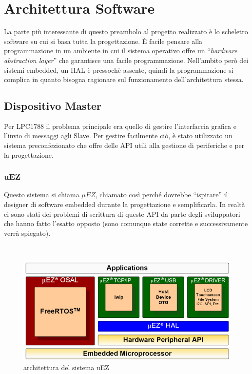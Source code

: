 \documentclass[a4paper,titlepage]{book}
\begin{document}
\chapter{Architettura Software}

La parte più interessante di questo preambolo al progetto realizzato è lo scheletro software su cui si basa tutta la progettazione. È facile pensare alla programmazione in un ambiente in cui il sistema operativo offre un ``\textit{hardware abstraction layer}'' che garantisce una facile programmazione. Nell'ambito però dei sistemi embedded, un HAL è pressochè assente, quindi la programmazione si complica in quanto bisogna ragionare sul funzionamento dell'architettura stessa.


\section{Dispositivo Master}

Per LPC1788 il problema principale era quello di gestire l'interfaccia grafica e l'invio di messaggi agli Slave. Per gestire facilmente ciò, è stato utilizzato un sistema preconfezionato che offre delle API utili alla gestione di periferiche e per la progettazione. 


\subsection{uEZ}
Questo sistema si chiama $\mu EZ$, chiamato così perché dovrebbe ``ispirare'' il designer di software embedded durante la progettazione e semplificarla. In realtà ci sono stati dei problemi di scrittura di queste API da parte degli sviluppatori che hanno fatto l'esatto opposto (sono comunque state corrette e successivamente verrà spiegato).

~

\begin{figure}[!h]
\centering
\includegraphics[scale=0.7]{uEZ.png}
\caption{architettura del sistema uEZ}\label{fig:1}
\end{figure}
\end{document}
